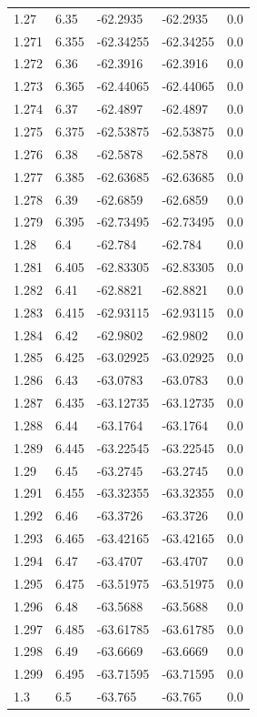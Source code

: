 \begin{tabular}{lllll}
1.27 & 6.35 & -62.2935 & -62.2935 & 0.0 \\
1.271 & 6.355 & -62.34255 & -62.34255 & 0.0 \\
1.272 & 6.36 & -62.3916 & -62.3916 & 0.0 \\
1.273 & 6.365 & -62.44065 & -62.44065 & 0.0 \\
1.274 & 6.37 & -62.4897 & -62.4897 & 0.0 \\
1.275 & 6.375 & -62.53875 & -62.53875 & 0.0 \\
1.276 & 6.38 & -62.5878 & -62.5878 & 0.0 \\
1.277 & 6.385 & -62.63685 & -62.63685 & 0.0 \\
1.278 & 6.39 & -62.6859 & -62.6859 & 0.0 \\
1.279 & 6.395 & -62.73495 & -62.73495 & 0.0 \\
1.28 & 6.4 & -62.784 & -62.784 & 0.0 \\
1.281 & 6.405 & -62.83305 & -62.83305 & 0.0 \\
1.282 & 6.41 & -62.8821 & -62.8821 & 0.0 \\
1.283 & 6.415 & -62.93115 & -62.93115 & 0.0 \\
1.284 & 6.42 & -62.9802 & -62.9802 & 0.0 \\
1.285 & 6.425 & -63.02925 & -63.02925 & 0.0 \\
1.286 & 6.43 & -63.0783 & -63.0783 & 0.0 \\
1.287 & 6.435 & -63.12735 & -63.12735 & 0.0 \\
1.288 & 6.44 & -63.1764 & -63.1764 & 0.0 \\
1.289 & 6.445 & -63.22545 & -63.22545 & 0.0 \\
1.29 & 6.45 & -63.2745 & -63.2745 & 0.0 \\
1.291 & 6.455 & -63.32355 & -63.32355 & 0.0 \\
1.292 & 6.46 & -63.3726 & -63.3726 & 0.0 \\
1.293 & 6.465 & -63.42165 & -63.42165 & 0.0 \\
1.294 & 6.47 & -63.4707 & -63.4707 & 0.0 \\
1.295 & 6.475 & -63.51975 & -63.51975 & 0.0 \\
1.296 & 6.48 & -63.5688 & -63.5688 & 0.0 \\
1.297 & 6.485 & -63.61785 & -63.61785 & 0.0 \\
1.298 & 6.49 & -63.6669 & -63.6669 & 0.0 \\
1.299 & 6.495 & -63.71595 & -63.71595 & 0.0 \\
1.3 & 6.5 & -63.765 & -63.765 & 0.0 \\

\end{tabular}
